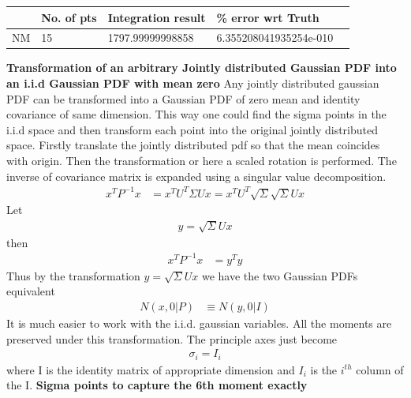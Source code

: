 \documentclass{article}
\begin{document}
\begin{center}
  \begin{tabular}{ | l | l | l | l | l | }
    \hline
                  					&   No. of pts			& Integration result 			  & \% error wrt Truth			 \\ \hline 
      NM          					&   15       			  & 1797.99999998858          & 6.355208041935254e-010   \\
      \hline
  \end{tabular}
\end{center}
{\bf Transformation of an arbitrary Jointly distributed Gaussian PDF into an i.i.d Gaussian PDF with mean zero }\newline\newline
	Any jointly distributed gaussian PDF can be transformed into a Gaussian PDF of zero mean and identity covariance of same dimension. This way one could find the sigma points in the i.i.d space and then transform each point into the original jointly distributed space. Firstly translate the jointly distributed pdf so that the mean coincides with origin. Then the transformation or here a scaled rotation is performed. The inverse of covariance matrix is expanded using a singular value decomposition.
	\begin{align}
	x^TP^{-1}x&=x^TU^T\Sigma Ux =x^TU^T\sqrt{\Sigma}\sqrt{\Sigma} Ux 
	\end{align}
	Let
	\begin{align}
	y=\sqrt{\Sigma}Ux
	\end{align}
	then
	\begin{align}
	x^TP^{-1}x&=y^Ty 
	\end{align}
	  Thus by the transformation $y=\sqrt{\Sigma}Ux$ we have the two Gaussian PDFs equivalent
	  \begin{align}
	  N(x,0|P)&\equiv N(y,0|I)
	  \end{align}
	  It is much easier to work with the i.i.d. gaussian variables. All the moments are preserved under this transformation. The principle axes just become
	  \begin{align}
	  \sigma_i=I_i
	  \end{align}
	  where I is the identity matrix of appropriate dimension and $I_i$ is the $i^{th}$ column of the I.
\newline\newline
{\bf Sigma points to capture the 6th moment exactly }\newline\newline
\end{document}
